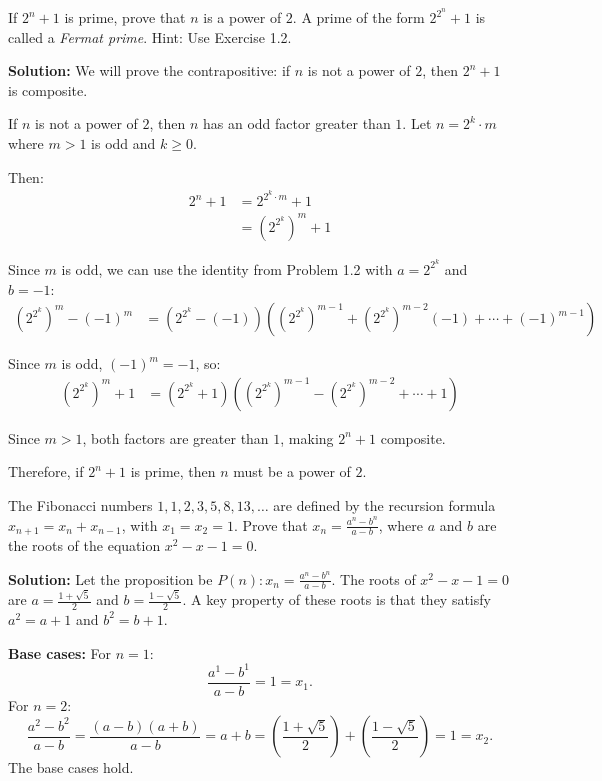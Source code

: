\begin{problembox}
If $2^n + 1$ is prime, prove that $n$ is a power of $2$. A prime of the form $2^{2^n} + 1$ is called a \textit{Fermat prime}. Hint: Use Exercise 1.2.
\end{problembox}

\textbf{Solution:}
We will prove the contrapositive: if $n$ is not a power of $2$, then $2^n + 1$ is composite.

If $n$ is not a power of $2$, then $n$ has an odd factor greater than $1$. Let $n = 2^k \cdot m$ where $m > 1$ is odd and $k \geq 0$.

Then:
\begin{align*}
2^n + 1 &= 2^{2^k \cdot m} + 1 \\
&= (2^{2^k})^m + 1
\end{align*}

Since $m$ is odd, we can use the identity from Problem 1.2 with $a = 2^{2^k}$ and $b = -1$:
\begin{align*}
(2^{2^k})^m - (-1)^m &= (2^{2^k} - (-1))((2^{2^k})^{m-1} + (2^{2^k})^{m-2}(-1) + \cdots + (-1)^{m-1})
\end{align*}

Since $m$ is odd, $(-1)^m = -1$, so:
\begin{align*}
(2^{2^k})^m + 1 &= (2^{2^k} + 1)((2^{2^k})^{m-1} - (2^{2^k})^{m-2} + \cdots + 1)
\end{align*}

Since $m > 1$, both factors are greater than $1$, making $2^n + 1$ composite.

Therefore, if $2^n + 1$ is prime, then $n$ must be a power of $2$.

\begin{problembox}
The Fibonacci numbers $1, 1, 2, 3, 5, 8, 13, \dots$ are defined by the recursion formula $x_{n+1} = x_n + x_{n-1}$, with $x_1 = x_2 = 1$. Prove that $x_n = \frac{a^n - b^n}{a - b}$, where $a$ and $b$ are the roots of the equation $x^2 - x - 1 = 0$.
\end{problembox}

\textbf{Solution:}
Let the proposition be $P(n): x_n = \frac{a^n - b^n}{a-b}$. The roots of $x^2 - x - 1 = 0$ are $a = \frac{1+\sqrt{5}}{2}$ and $b = \frac{1-\sqrt{5}}{2}$.
A key property of these roots is that they satisfy $a^2 = a+1$ and $b^2 = b+1$.

\textbf{Base cases:}
For $n=1$:
\[ \frac{a^1 - b^1}{a-b} = 1 = x_1. \]
For $n=2$:
\[ \frac{a^2 - b^2}{a-b} = \frac{(a-b)(a+b)}{a-b} = a+b = \left(\frac{1+\sqrt{5}}{2}\right) + \left(\frac{1-\sqrt{5}}{2}\right) = 1 = x_2. \]
The base cases hold.


